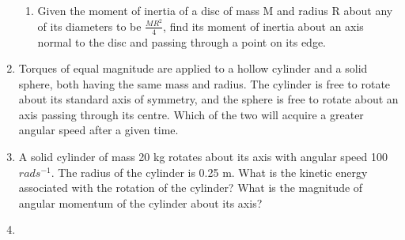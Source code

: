 \begin{enumerate}[label=\thesection.\arabic*.,ref=\thesection.\theenumi]
\begin{enumerate}[label=(\alph*)]
\item  Given the moment of inertia of a disc of mass M and radius R about any of its diameters to be $\frac{MR^2}{4}$, find its moment of inertia about an axis normal to the
disc and passing through a point on its edge. 
\end{enumerate}
\item Torques of equal magnitude are applied to a hollow cylinder and a solid sphere, both having the same mass and radius. The cylinder is free to rotate about its standard axis of symmetry, and the sphere is free to rotate about an axis passing through its centre. Which of the two will acquire a greater angular speed after a given time.
\item A solid cylinder of mass 20 kg rotates about its axis with angular speed 100 $rad s^{-1}$. The radius of the cylinder is 0.25 m. What is the kinetic energy associated with the rotation of the cylinder? What is the magnitude of angular momentum of the cylinder about its axis?
\item 
\begin{enumerate}[label=(\alph*)]


\end{enumerate}
\end{enumerate}
